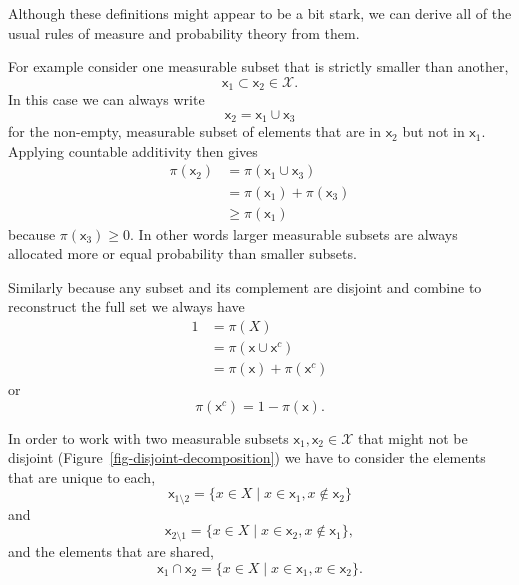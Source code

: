 \documentclass[
  letterpaper,
  DIV=11,
  numbers=noendperiod]{scrartcl}
\begin{document}
Although these definitions might appear to be a bit stark, we can derive
all of the usual rules of measure and probability theory from them.

For example consider one measurable subset that is strictly smaller than
another, \[
\mathsf{x}_{1} \subset \mathsf{x}_{2} \in \mathcal{X}.
\] In this case we can always write \[
\mathsf{x}_{2} = \mathsf{x}_{1} \cup \mathsf{x}_{3}
\] for the non-empty, measurable subset of elements that are in
\(\mathsf{x}_{2}\) but not in \(\mathsf{x}_{1}\). Applying countable
additivity then gives \begin{align*}
\pi(\mathsf{x}_{2})
&= \pi(\mathsf{x}_{1} \cup \mathsf{x}_{3})
\\
&= \pi(\mathsf{x}_{1}) + \pi(\mathsf{x}_{3})
\\
&\ge \pi(\mathsf{x}_{1})
\end{align*} because \(\pi(\mathsf{x}_{3}) \ge 0\). In other words
larger measurable subsets are always allocated more or equal probability
than smaller subsets.

Similarly because any subset and its complement are disjoint and combine
to reconstruct the full set we always have \begin{align*}
1
&= \pi(X)
\\
&= \pi(\mathsf{x} \cup \mathsf{x}^{c})
\\
&= \pi(\mathsf{x}) + \pi(\mathsf{x}^{c})
\end{align*} or \[
\pi(\mathsf{x}^{c}) = 1 - \pi(\mathsf{x}).
\]

In order to work with two measurable subsets
\(\mathsf{x}_{1}, \mathsf{x}_{2} \in \mathcal{X}\) that might not be
disjoint (Figure~\ref{fig-disjoint-decomposition}) we have to consider
the elements that are unique to each, \[
\mathsf{x}_{1 \setminus 2}
=
\{ x \in X \mid x \in \mathsf{x}_{1}, x \notin \mathsf{x}_{2} \}
\] and \[
\mathsf{x}_{2 \setminus 1}
=
\{ x \in X \mid x \in \mathsf{x}_{2}, x \notin \mathsf{x}_{1} \},
\] and the elements that are shared, \[
\mathsf{x}_{1} \cap \mathsf{x}_{2}
=
\{ x \in X \mid x \in \mathsf{x}_{1}, x \in \mathsf{x}_{2} \}.
\]
\end{document}
